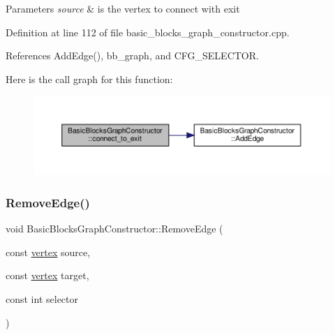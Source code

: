 \begin{DoxyParams}{Parameters}
{\em source} & is the vertex to connect with exit \\
\hline
\end{DoxyParams}


Definition at line 112 of file basic\+\_\+blocks\+\_\+graph\+\_\+constructor.\+cpp.



References Add\+Edge(), bb\+\_\+graph, and C\+F\+G\+\_\+\+S\+E\+L\+E\+C\+T\+OR.

Here is the call graph for this function\+:
\nopagebreak
\begin{figure}[H]
\begin{center}
\leavevmode
\includegraphics[width=350pt]{d6/d91/classBasicBlocksGraphConstructor_ab3c2b2d78837ddceb07ce85913aa9eb2_cgraph}
\end{center}
\end{figure}
\mbox{\label{classBasicBlocksGraphConstructor_a99505b0a5cf3962fb5b95494d0158706}} 
\subsubsection{\texorpdfstring{Remove\+Edge()}{RemoveEdge()}\hspace{0.1cm}{\footnotesize\ttfamily [1/2]}}
{\footnotesize\ttfamily void Basic\+Blocks\+Graph\+Constructor\+::\+Remove\+Edge (\begin{DoxyParamCaption}\item[{const \hyperlink{graph_8hpp_abefdcf0544e601805af44eca032cca14}{vertex}}]{source,  }\item[{const \hyperlink{graph_8hpp_abefdcf0544e601805af44eca032cca14}{vertex}}]{target,  }\item[{const int}]{selector }\end{DoxyParamCaption})}



